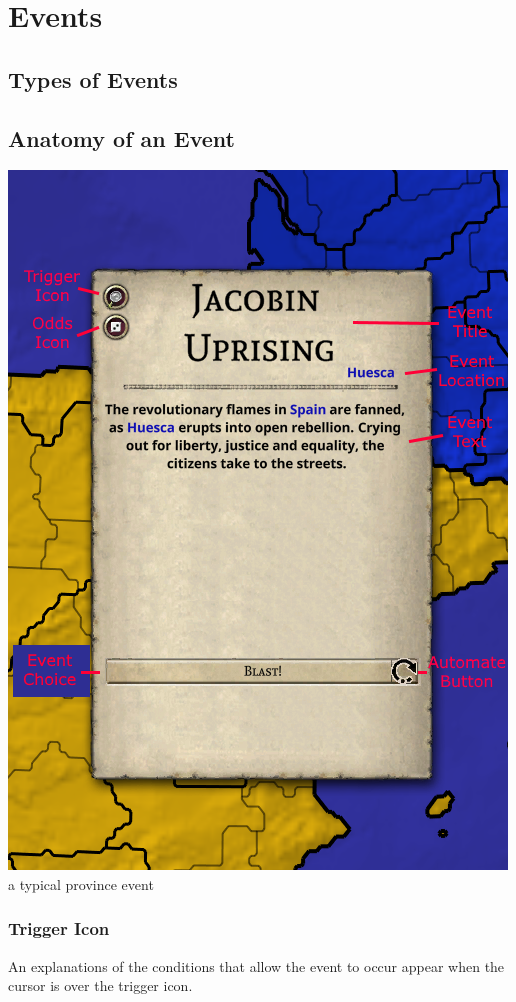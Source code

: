 \chapter{Events}
\section{Types of Events}
\section{Anatomy of an Event}
\begin{center}
	\includegraphics{province_event.png}
	\small{a typical province event}
\end{center}
\subsection{Trigger Icon}
An explanations of the conditions that allow the event to occur appear when the cursor is over the trigger icon.

